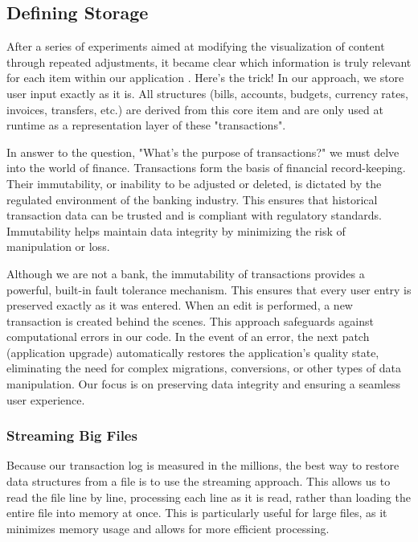 
\subsection{Defining Storage}

After a series of experiments aimed at modifying the visualization of content through repeated adjustments, it became clear which information is truly relevant for each item within our application . Here's the trick! In our approach, we store user input exactly as it is. All structures (bills, accounts, budgets, currency rates, invoices, transfers, etc.) are derived from this core item and are only used at runtime as a representation layer of these "transactions".

In answer to the question, "What's the purpose of transactions?" we must delve into the world of finance. Transactions 
form the basis of financial record-keeping. Their immutability, or inability to be adjusted or deleted, is dictated by 
the regulated environment of the banking industry. This ensures that historical transaction data can be trusted and is 
compliant with regulatory standards. Immutability helps maintain data integrity by minimizing the risk of manipulation 
or loss.

\noindent Although we are not a bank, the immutability of transactions provides a powerful, built-in fault tolerance 
mechanism. This ensures that every user entry is preserved exactly as it was entered. When an edit is performed, a new 
transaction is created behind the scenes. This approach safeguards against computational errors in our code. In the 
event of an error, the next patch (application upgrade) automatically restores the application's quality state, 
eliminating the need for complex migrations, conversions, or other types of data manipulation. Our focus is on 
preserving data integrity and ensuring a seamless user experience.


\subsubsection{Streaming Big Files}

Because our transaction log is measured in the millions, the best way to restore data structures from a file is to use the streaming approach. This allows us to read the file line by line, processing each line as it is read, rather than loading the entire file into memory at once. This is particularly useful for large files, as it minimizes memory usage and allows for more efficient processing.

